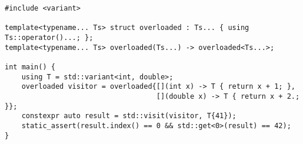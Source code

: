 \begin{lstlisting}[title=\href{https://godbolt.org/z/b988jT}{\texttt{godbolt.org/z/b988jT}}]
#include <variant>

template<typename... Ts> struct overloaded : Ts... { using Ts::operator()...; };
template<typename... Ts> overloaded(Ts...) -> overloaded<Ts...>;

int main() {
    using T = std::variant<int, double>;
    overloaded visitor = overloaded{[](int x) -> T { return x + 1; },
                                    [](double x) -> T { return x + 2.; }};
    constexpr auto result = std::visit(visitor, T{41});
    static_assert(result.index() == 0 && std::get<0>(result) == 42);
}
\end{lstlisting}

